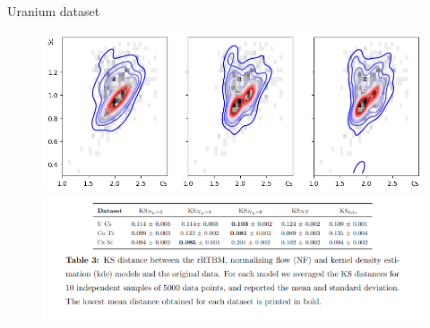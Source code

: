 \documentclass[10pt]{beamer}
\begin{document}
\begin{frame}{Uranium dataset}

    \begin{figure}
        \includegraphics[scale=0.5]{figures/uranium56.png}
        \includegraphics[scale=0.5]{figures/Screenshot from 2022-09-03 11-00-13.png}
    \end{figure}
    
    
\end{frame}
\end{document}
